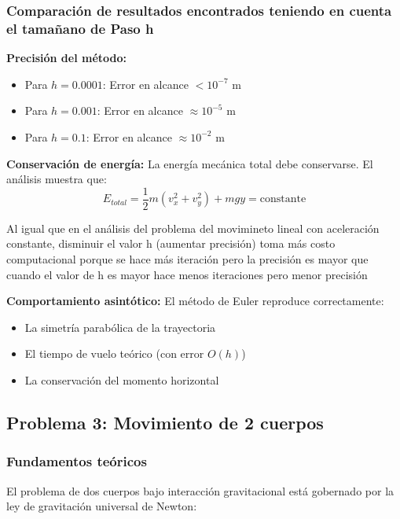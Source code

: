 \documentclass{article}
\begin{document}
\begin{center}
	\subsubsection{Comparación de resultados encontrados teniendo en cuenta el tamañano de Paso h}
	
	\textbf{Precisión del método:}
	\begin{itemize}
	\item Para $h = 0.0001$: Error en alcance $< 10^{-7}$ m
	\item Para $h = 0.001$: Error en alcance $\approx 10^{-5}$ m
	\item Para $h = 0.1$: Error en alcance $\approx 10^{-2}$ m
	\end{itemize}
	
	\textbf{Conservación de energía:}
	La energía mecánica total debe conservarse. El análisis muestra que:
	\begin{equation}
		E_{total} = \frac{1}{2}m(v_x^2 + v_y^2) + mgy = \text{constante}
	\end{equation}
	
	Al igual que en el análisis del problema del movimineto lineal con aceleración constante, disminuir el valor h (aumentar precisión) toma más costo computacional porque se hace más iteración pero la precisión es mayor que cuando el valor de h es mayor hace menos iteraciones pero menor precisión
	
	\textbf{Comportamiento asintótico:}
	El método de Euler reproduce correctamente:
	\begin{itemize}
	\item La simetría parabólica de la trayectoria
	\item El tiempo de vuelo teórico (con error $O(h)$)
	\item La conservación del momento horizontal
	\end{itemize}


	\subsection{Problema 3: Movimiento de 2 cuerpos}
	
	\subsubsection{Fundamentos teóricos}
	
	El problema de dos cuerpos bajo interacción gravitacional está gobernado por la ley de gravitación universal de Newton:
	

\end{center}
\end{document}
